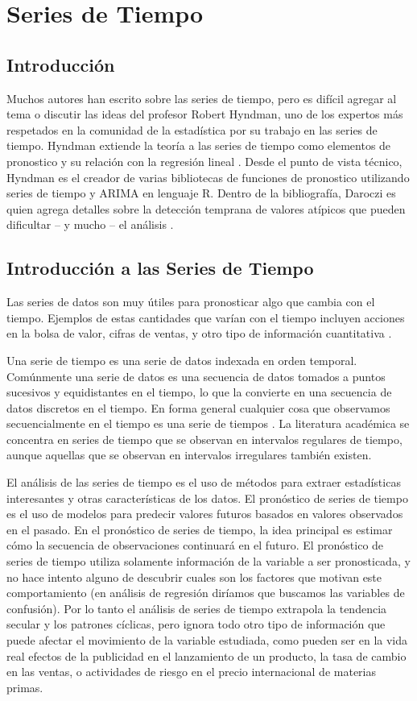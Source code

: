 \section*{Series de Tiempo}

\subsection*{Introducción}
Muchos autores han escrito sobre las series de tiempo, pero es difícil agregar al tema o discutir las ideas del profesor Robert Hyndman, uno de los expertos más respetados en la comunidad de la estadística por su trabajo en las series de tiempo. Hyndman extiende la teoría a las series de tiempo como elementos de pronostico y su relación con la regresión lineal \cite{hyndman}. Desde el punto de vista técnico, Hyndman es el creador de varias bibliotecas de funciones de pronostico utilizando series de tiempo y ARIMA en lenguaje R. Dentro de la bibliografía, Daroczi es quien agrega detalles sobre la detección temprana de valores atípicos que pueden dificultar – y mucho – el análisis \cite{daroczi}.

\subsection*{Introducción a las Series de Tiempo}
Las series de datos son muy útiles para pronosticar algo que cambia con el tiempo. Ejemplos de estas cantidades que varían con el tiempo incluyen acciones en la bolsa de valor, cifras de ventas, y otro tipo de información cuantitativa \cite{hyndman}.

Una serie de tiempo es una serie de datos indexada en orden temporal. Comúnmente una serie de datos es una secuencia de datos tomados a puntos sucesivos y equidistantes en el tiempo, lo que la convierte en una secuencia de datos discretos en el tiempo. En forma general cualquier cosa que observamos secuencialmente en el tiempo es una serie de tiempos \cite{hyndman}. La literatura académica se concentra en series de tiempo que se observan en intervalos regulares de tiempo, aunque aquellas que se observan en intervalos irregulares también existen.

El análisis de las series de tiempo es el uso de métodos para extraer estadísticas interesantes y otras características de los datos. El pronóstico de series de tiempo es el uso de modelos para predecir valores futuros basados en valores observados en el pasado. En el pronóstico de series de tiempo, la idea principal es estimar cómo la secuencia de observaciones continuará en el futuro. El pronóstico de series de tiempo utiliza solamente información de la variable a ser pronosticada, y no hace intento alguno de descubrir cuales son los factores que motivan este comportamiento (en análisis de regresión diríamos que buscamos las variables de confusión). Por lo tanto el análisis de series de tiempo extrapola la tendencia secular y los patrones cíclicas, pero ignora todo otro tipo de información que puede afectar el movimiento de la variable estudiada, como pueden ser en la vida real efectos de la publicidad en el lanzamiento de un producto, la tasa de cambio en las ventas, o actividades de riesgo en el precio internacional de materias primas.

